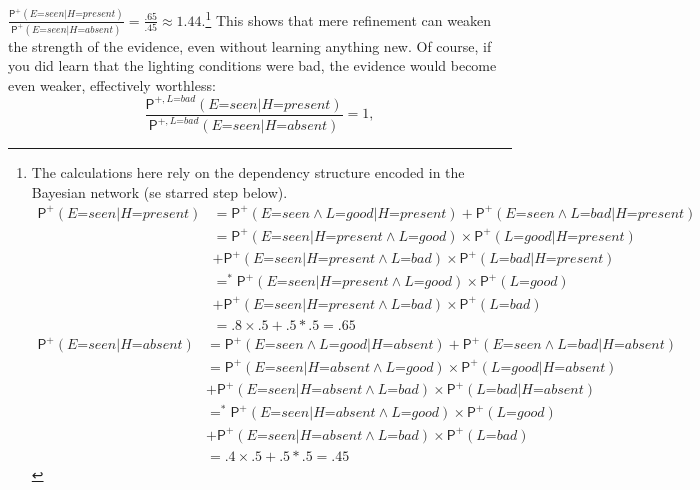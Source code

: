 \documentclass[
  11pt,
  dvipsnames,enabledeprecatedfontcommands]{scrartcl}
\newcommand{\ppr}[2]{\ensuremath{\mathsf{P}^{#1}(#2)}}
\begin{document}
\(\frac{\ppr{+}{\textit{E=seen} \vert \textit{H=present}}}{\ppr{+}{\textit{E=seen} \vert \textit{H=absent}}}=\frac{.65}{.45}\approx 1.44\).\footnote{The
  calculations here rely on the dependency structure encoded in the
  Bayesian network (se starred step below). \begin{align*}
  \ppr{+}{\textit{E=seen} \vert \textit{H=present}} &= \ppr{+}{\textit{E=seen} \wedge \textit{L=good} \vert \textit{H=present}}+\ppr{+}{\textit{E=seen} \wedge \textit{L=bad} \vert \textit{H=present}}\\
  &= \ppr{+}{\textit{E=seen} \vert \textit{H=present} \wedge \textit{L=good}}  \times \ppr{+}{\textit{L=good} \vert  \textit{H=present} }\\ & +\ppr{+}{\textit{E=seen}  \vert \textit{H=present} \wedge \textit{L=bad}} \times \ppr{+}{\textit{L=bad} \vert  \textit{H=present}}\\
  &=^* \ppr{+}{\textit{E=seen} \vert \textit{H=present} \wedge \textit{L=good}}  \times \ppr{+}{\textit{L=good}}\\ & +\ppr{+}{\textit{E=seen}  \vert \textit{H=present} \wedge \textit{L=bad}} \times \ppr{+}{\textit{L=bad}}\\
  &= .8 \times .5 +.5 *.5 = .65 
  \end{align*} \begin{align*}
  \ppr{+}{\textit{E=seen} \vert \textit{H=absent}} &= \ppr{+}{\textit{E=seen} \wedge \textit{L=good} \vert \textit{H=absent}}+\ppr{+}{\textit{E=seen} \wedge \textit{L=bad} \vert \textit{H=absent}}\\
  &= \ppr{+}{\textit{E=seen} \vert \textit{H=absent} \wedge \textit{L=good}}  \times \ppr{+}{\textit{L=good} \vert  \textit{H=absent} }\\ & +\ppr{+}{\textit{E=seen}  \vert \textit{H=absent} \wedge \textit{L=bad}} \times \ppr{+}{\textit{L=bad} \vert  \textit{H=absent}}\\
  &=^* \ppr{+}{\textit{E=seen} \vert \textit{H=absent} \wedge \textit{L=good}}  \times \ppr{+}{\textit{L=good}}\\ & +\ppr{+}{\textit{E=seen}  \vert \textit{H=absent} \wedge \textit{L=bad}} \times \ppr{+}{\textit{L=bad}}\\
  &= .4 \times .5 +.5 *.5 = .45 
  \end{align*}} This shows that mere refinement can weaken the strength
of the evidence, even without learning anything new. Of course, if you
did learn that the lighting conditions were bad, the evidence would
become even weaker, effectively worthless:
\[\frac{\ppr{+, \textit{L=bad}}{\textit{E=seen} \vert \textit{H=present}}}{\ppr{+, \textit{L=bad}}{\textit{E=seen} \vert \textit{H=absent}}}=1,\]
\end{document}
